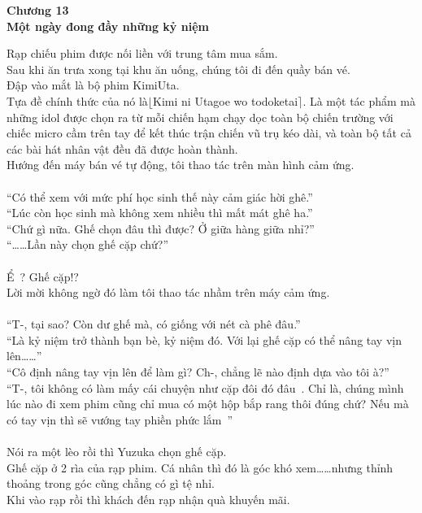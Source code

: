 \documentclass[12pt,a4paper, twosides]{book}
\begin{document}
    \begin{center}
    \textbf{\large Chương 13 \\ Một ngày đong đầy những kỷ niệm}
    \end{center}
    \noindent
Rạp chiếu phim được nối liền với trung tâm mua sắm.\\
Sau khi ăn trưa xong tại khu ăn uống, chúng tôi đi đến quầy bán vé.\\
Đập vào mắt là bộ phim KimiUta.\\
Tựa đề chính thức của nó là$\lfloor$Kimi ni Utagoe wo todoketai$\rceil$. Là một tác phẩm mà những idol được chọn ra từ mỗi chiến hạm chạy dọc toàn bộ chiến trường với chiếc micro cầm trên tay để kết thúc trận chiến vũ trụ kéo dài, và toàn bộ tất cả các bài hát nhân vật đều đã được hoàn thành.\\
Hướng đến máy bán vé tự động, tôi thao tác trên màn hình cảm ứng.\\
\\
“Có thể xem với mức phí học sinh thế này cảm giác hời ghê.”\\
“Lúc còn học sinh mà không xem nhiều thì mất mát ghê ha.”\\
“Chứ gì nữa. Ghế chọn đâu thì được? Ở giữa hàng giữa nhỉ?”\\
“……Lần này chọn ghế cặp chứ?”\\
\\
Ể~? Ghế cặp!?\\
Lời mời không ngờ đó làm tôi thao tác nhầm trên máy cảm ứng.\\
\\
“T-, tại sao? Còn dư ghế mà, có giống với nét cà phê đâu.”\\
“Là kỷ niệm trở thành bạn bè, kỷ niệm đó. Với lại ghế cặp có thể nâng tay vịn lên……”\\
“Cô định nâng tay vịn lên để làm gì? Ch-, chẳng lẽ nào định dựa vào tôi à?”\\
“T-, tôi không có làm mấy cái chuyện như cặp đôi đó đâu~. Chỉ là, chúng mình lúc nào đi xem phim cũng chỉ mua có một hộp bắp rang thôi đúng chứ? Nếu mà có tay vịn thì sẽ vướng tay phiền phức lắm~”\\
\\
Nói ra một lèo rồi thì Yuzuka chọn ghế cặp.\\
Ghế cặp ở 2 rìa của rạp phim. Cá nhân thì đó là góc khó xem……nhưng thỉnh thoảng trong góc cũng chẳng có gì tệ nhỉ.\\
Khi vào rạp rồi thì khách đến rạp nhận quà khuyến mãi.\\
\\
\end{document}
